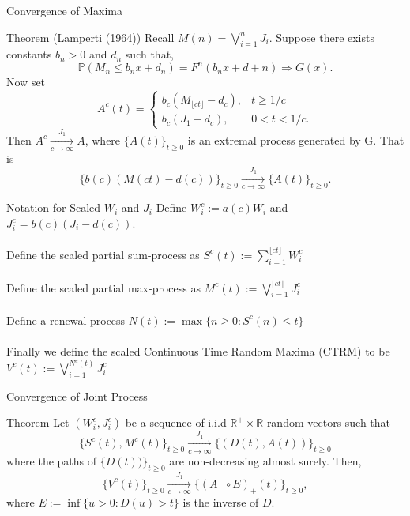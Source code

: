 \documentclass{beamer}
\newcommand{\Prob}{\mathbb{P}}
\begin{document}
\begin{frame}{Convergence of Maxima}
	\begin{block}{Theorem (Lamperti (1964))}
		Recall $M(n)=\bigvee_{i=1}^n J_i$. Suppose there exists constants ${b_n}>0$ and $d_n$ such that,
		\[
		    \Prob(M_n\leq b_nx+d_n)=F^n(b_nx+d+n) \Rightarrow G(x).
		\]
		Now set
		\[
	        A^{c}(t)=
	        \begin{cases}
	            b_c(M_{\lfloor{ct}\rfloor}-d_c), &\textrm{$t\geq 1/c$}\\
	            b_c(J_1-d_c), &\textrm{$0<t<1/c.$}
	        \end{cases}
		\]
		Then $A^c \xrightarrow[c\to \infty]{J_1} A$, where $\{A(t)\}_{t\geq0}$ is an extremal process generated by G. That is
		\[
            \{b(c)(M(ct)-d(c))\}_{t\geq0} \xrightarrow[c\to \infty]{J_1} \{A(t)\}_{t\geq0}.
	    \]
	\end{block}
\end{frame}

\begin{frame}{Notation for Scaled $W_i$ and $J_i$}
    Define $W_i^c:=a(c)W_i$ and $J_i^c=b(c)(J_i-d(c))$.
    \\~\\
    Define the scaled partial sum-process as $S^c(t):=\sum^{\lfloor{ct}\rfloor}_{i=1} W_i^c$
    \\~\\
    Define the scaled partial max-process as $M^c(t):=\bigvee_{i=1}^{\lfloor{ct}\rfloor} J_i^c$
    \\~\\
    Define a renewal process $N(t):=\max\{n\geq0:S^c(n)\leq t\}$
    \\~\\
    Finally we define the scaled Continuous Time Random Maxima (CTRM) to be $V^c(t):=\bigvee_{i=1}^{N^c(t)} J_i^c$
\end{frame}

\begin{frame}{Convergence of Joint Process}
    \begin{block}{Theorem}
        Let $(W_i^c,J_i^c)$ be a sequence of i.i.d $\mathbb{R}^+\times\mathbb{R}$ random vectors such that
        \[
            \{S^c(t),M^c(t)\}_{t\geq0} \xrightarrow[c\to \infty]{J_1} \{(D(t),A(t))\}_{t\geq0}
        \]
        where the paths of $\{D(t))\}_{t\geq0}$ are non-decreasing almost surely. Then,
        \[
            \{V^c(t)\}_{t\geq0} \xrightarrow[c\to \infty]{J_1} \{(A_-\circ E)_+(t)\}_{t\geq0},
        \]
        where $E:=\inf \{u>0:D(u)>t\}$ is the inverse of $D$.
    \end{block}
\end{frame}

 
\end{document}
